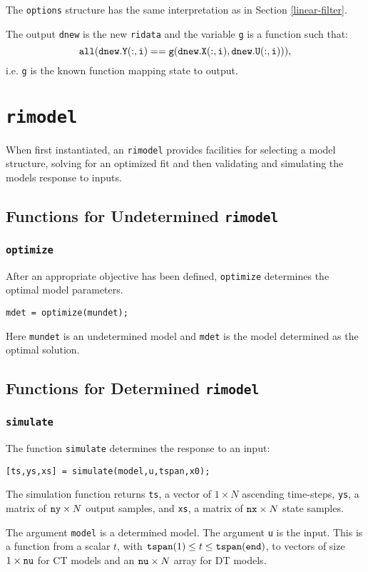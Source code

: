\documentclass{article}
\begin{document}
The {\tt options} structure has the same interpretation as in Section
\ref{linear-filter}.

The output {\tt dnew} is the new {\tt ridata} and the variable {\tt g} is
a function such that:
$${\tt all(dnew.Y(:,i) == g(dnew.X(:,i),dnew.U(:,i))}),$$
i.e. {\tt g} is the known function
mapping state to output.

 
 \section{{\tt rimodel}}
When first instantiated, an {\tt rimodel} provides facilities for
selecting a model structure, solving for an optimized fit and then
validating and simulating the models response to inputs.

\subsection{Functions for Undetermined {\tt rimodel}}
\subsubsection{{\tt optimize}}
After an appropriate objective has been defined, {\tt optimize}
determines the optimal model parameters.
\begin{verbatim}
mdet = optimize(mundet);
\end{verbatim}
Here {\tt mundet} is an undetermined model and {\tt mdet} is the model
determined as the optimal solution.
\subsection{Functions for Determined {\tt rimodel}}
\subsubsection{{\tt simulate}}
The function {\tt simulate} determines the response to an input:
\begin{verbatim}
[ts,ys,xs] = simulate(model,u,tspan,x0);
\end{verbatim}
The simulation function returns {\tt ts}, a vector of $1 \times N$
ascending time-steps, {\tt ys}, a matrix of ${\tt ny} \times N$ output
samples, and {\tt xs}, a matrix of ${\tt nx} \times N$ state samples.  

The argument {\tt model} is a determined model.  The argument {\tt u}
is the input.  This is a function from a scalar $t$, with ${\tt
  tspan}(1) \leq t \leq {\tt tspan(end)}$, to vectors of size $1
\times {\tt nu}$ for CT models and an ${\tt nu} \times N$ array for DT
models.
\end{document}
